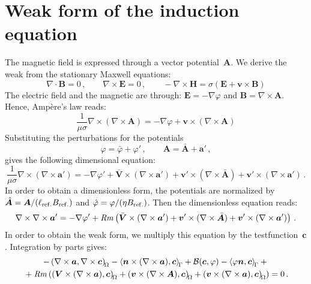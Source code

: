 \section{Weak form of the induction equation}
The magnetic field is expressed through a vector potential~$\bm{A}$. We derive the weak from the stationary Maxwell equations:
\begin{equation}
	\nabla\cdot\bm{B}=0\,,\qquad
	\nabla\times\bm{E}=0\,,\qquad
	-\nabla\times\bm{H}=\sigma(\bm{E}+\bm{v}\times\bm{B})
\end{equation}
The electric field and the magnetic are through: $\bm{E}=-\nabla\varphi$ and $\bm{B}=\nabla\times\bm{A}$. Hence, Amp\`ere's law reads:
\begin{equation}
	\frac{1}{\mu\sigma}\nabla\times(\nabla\times\bm{A})=-\nabla\varphi+\bm{v}\times(\nabla\times\bm{A})
\end{equation}
Substituting the perturbations for the potentials
\begin{equation}
	\varphi=\bar{\varphi}+\varphi'\,,\qquad
	\bm{A}=\bar{\bm{A}}+\bm{a}'\,,
\end{equation}
gives the following dimensional equation:
\begin{equation}
	\frac{1}{\mu\sigma}\nabla\times(\nabla\times\bm{a}')=-\nabla\varphi'+\bar{\bm{V}}\times(\nabla\times\bm{a}')+\bm{v}'\times(\nabla\times\bar{\bm{A}})+\bm{v}'\times(\nabla\times\bm{a}')\,.
\end{equation}
In order to obtain a dimensionless form, the potentials are normalized by $\hat{\bm{A}}=\bm{A}/(\ell_{\mathrm{ref.}}B_{\mathrm{ref.}})$ and $\hat{\varphi}=\varphi/(\eta B_{\mathrm{ref.}})$. Then the dimensionless equation reads:
\begin{equation}
	\nabla\times\nabla\times\bm{a}'=-\nabla\varphi'+\mathit{Rm}\left(\bar{\bm{V}}\times(\nabla\times\bm{a}')+\bm{v}'\times(\nabla\times\bar{\bm{A}})+\bm{v}'\times(\nabla\times\bm{a}')\right)\,.
\end{equation}
In order to obtain the weak form, we multiply this equation by the testfunction~$\bm{c}$. Integration by parts gives:
\begin{multline}
	-\left(\nabla\times\bm{a}, \nabla\times\bm{c}\right)_{\!{\Omega}}-\left\langle\bm{n}\times(\nabla\times\bm{a}), \bm{c}\right\rangle_{\!{\Gamma}}+\mathcal{B}(\bm{c}, \varphi)-\left\langle\varphi\bm{n}, \bm{c}\right\rangle_{\!{\Gamma}}+{}\\
	{}+\mathit{Rm}\left(\left(\bm{V}\times(\nabla\times\bm{a}), \bm{c}\right)_{\!{\Omega}}+\left(\bm{v}\times(\nabla\times\bm{A}), \bm{c}\right)_{\!{\Omega}}+\left(\bm{v}\times(\nabla\times\bm{a}), \bm{c}\right)_{\!{\Omega}}\right)=0\,.
\end{multline}